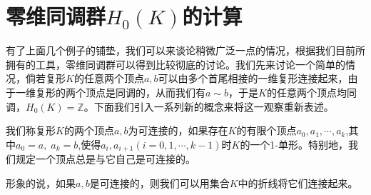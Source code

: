 \section{零维同调群$H_{0}(K)$的计算}
有了上面几个例子的铺垫，我们可以来谈论稍微广泛一点的情况，根据我们目前所拥有的工具，零维同调群可以得到比较彻底的讨论。我们先来讨论一个简单的情况，倘若复形$K$的任意两个顶点$a,b$可以由多个首尾相接的一维复形连接起来，由于一维复形的两个顶点是同调的，从而我们有$a\sim b$，于是$K$的任意两个顶点均同调，$H_{0}(K)=\mathbb{Z}$。下面我们引入一系列新的概念来将这一观察重新表述。
\begin{definition}
我们称复形$K$的两个顶点$a,b$为可连接的，如果存在$K$的有限个顶点$a_{0},a_{1},\cdots,a_{k}$,其中$a_{0}=a,\;a_{k}=b$,使得$a_{i},a_{i+1}(i=0,1,\cdots,k-1)$时$K$的一个1-单形。特别地，我们规定一个顶点总是与它自己是可连接的。
\end{definition}
形象的说，如果$a,b$是可连接的，则我们可以用集合$K$中的折线将它们连接起来。

